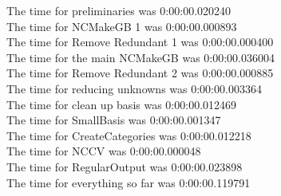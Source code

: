 \documentclass[rep10,leqno]{report}
\begin{document}
\noindent
The time for preliminaries was 0:00:00.020240\\
The time for NCMakeGB 1 was 0:00:00.000893\\
The time for Remove Redundant 1 was 0:00:00.000400\\
The time for the main NCMakeGB was 0:00:00.036004\\
The time for Remove Redundant 2 was 0:00:00.000885\\
The time for reducing unknowns was 0:00:00.003364\\
The time for clean up basis was 0:00:00.012469\\
The time for SmallBasis was 0:00:00.001347\\
The time for CreateCategories was 0:00:00.012218\\
The time for NCCV was 0:00:00.000048\\
The time for RegularOutput was 0:00:00.023898\\
The time for everything so far was 0:00:00.119791\\
\end{document}
